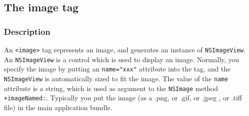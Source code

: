 %
%
%
%
%
%
%

\subsection{The image tag}

\subsubsection{Description}
An \texttt{<image>} tag represents an image, and generates an instance
of \texttt{NSImageView}.  An \texttt{NSImageView} is a control which
is used to display an image.  Normally, you specify the image by
putting an \texttt{name="xxx"} attribute into the tag, and the
\texttt{NSImageView} is automatically sized to fit the image.
The value of the \texttt{name} attribute is a string, which is used as
argument to the \texttt{NSImage} method \texttt{+imageNamed:}.
Typically you put the image (as a .png, or .gif, or .jpeg , or .tiff
file) in the main application bundle.

